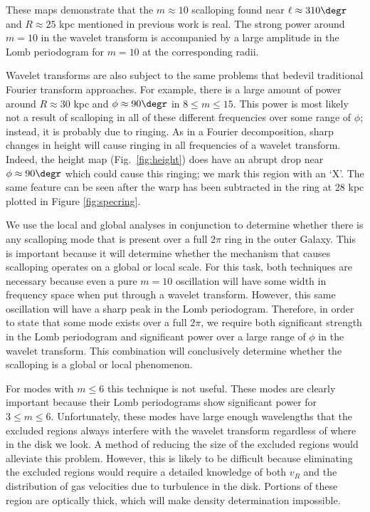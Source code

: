 \documentclass[apj]{emulateapj}
\begin{document}
These maps demonstrate that the $m\approx10$ scalloping found near $\ell\approx 310\degr$ and $R\approx 25$ kpc mentioned in previous work \citep{HJK1982,KBH1982} is real. The strong power around $m=10$ in the wavelet transform is accompanied by a large amplitude  in the Lomb periodogram for $m=10$ at the corresponding radii. 

Wavelet transforms are also subject to the same problems that bedevil traditional Fourier transform approaches. For example, there is a large amount of power around $R\approx30$ kpc and $\phi\approx90\degr$ in $8\le m\le15$. This power is most likely not a result of scalloping in all of these different frequencies over some range of $\phi$; instead, it is probably due to ringing.
 As in a Fourier decomposition, sharp changes in height will cause ringing in all frequencies of a wavelet transform. Indeed, the height map (Fig.~\ref{fig:height}) does have an abrupt drop near $\phi\approx90\degr$ which could cause this ringing; we mark this region with an `X'. The same feature can be seen after the warp has been subtracted in the ring at 28 kpc plotted in Figure \ref{fig:specring}. 
 
We use the local and global analyses in conjunction to  determine whether there is any scalloping mode that is present over a full $2\pi$ ring in the outer Galaxy. This is important because it will determine whether the mechanism that causes scalloping operates on a global or local scale. For this task, both techniques are necessary because even a pure $m=10$ oscillation will have some width in frequency space when put through a wavelet transform. However, this same oscillation will have a sharp peak  in the Lomb periodogram.  Therefore, in order to state that some mode exists over a full $2\pi$, we require both significant strength in the Lomb periodogram and significant power over a large range of $\phi$ in the wavelet transform. This combination will conclusively determine whether the scalloping is a global or local phenomenon. 

For modes with $m\le6$ this technique is not useful. These modes are clearly important because their Lomb periodograms  show  significant power for $3\le m\le 6$. Unfortunately, these modes have large enough wavelengths that the excluded regions always interfere with the wavelet transform regardless of where in the disk we look. A method of reducing the size of the excluded regions would alleviate this problem. However, this is likely to be difficult because eliminating the excluded regions would require a detailed knowledge of both $v_R$ and the distribution of gas velocities due to turbulence in the disk. Portions of these region are  optically thick, which will make density determination impossible.
 
\end{document}
